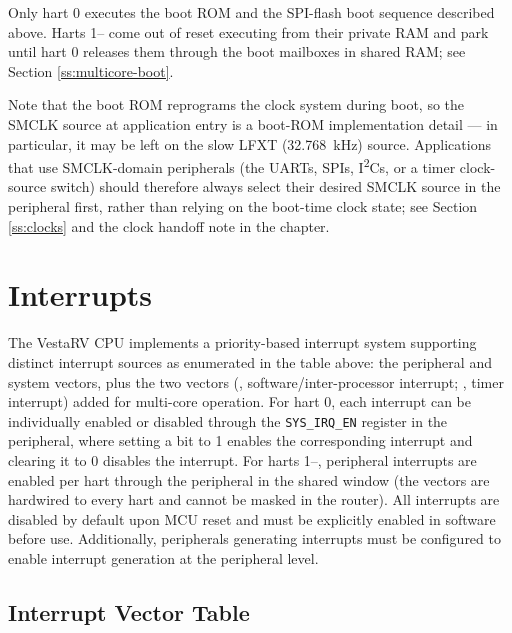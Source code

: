 \documentclass[11pt,pdftex,portrait,letterpaper]{article}
\begin{document}
Only hart 0 executes the boot ROM and the SPI-flash boot sequence described above. Harts 1--\MaxHartIndex{} come out of reset executing from their private RAM and park until hart 0 releases them through the boot mailboxes in shared RAM; see Section \ref{ss:multicore-boot}.

Note that the boot ROM reprograms the clock system during boot, so the SMCLK source at application entry is a boot-ROM implementation detail --- in particular, it may be left on the slow LFXT (32.768~\si{\kilo\hertz}) source. Applications that use SMCLK-domain peripherals (the UARTs, SPIs, I\textsuperscript{2}Cs, or a timer clock-source switch) should therefore always select their desired SMCLK source in the  peripheral first, rather than relying on the boot-time clock state; see Section \ref{ss:clocks} and the clock handoff note in the  chapter.

\newpage



\section{Interrupts} \label{s:interrupts}



The VestaRV CPU implements a priority-based interrupt system supporting \VectorsCount{} distinct interrupt sources as enumerated in the table above: the \PeriphVectorsCount{} peripheral and system vectors, plus the two  vectors (\ClintMsipVector, software/inter-processor interrupt; \ClintMtipVector, timer interrupt) added for multi-core operation. For hart 0, each interrupt can be individually enabled or disabled through the \texttt{SYS\_IRQ\_EN} register in the  peripheral, where setting a bit to 1 enables the corresponding interrupt and clearing it to 0 disables the interrupt. For harts 1--\MaxHartIndex, peripheral interrupts are enabled per hart through the  peripheral in the shared window (the  vectors are hardwired to every hart and cannot be masked in the router). All interrupts are disabled by default upon MCU reset and must be explicitly enabled in software before use. Additionally, peripherals generating interrupts must be configured to enable interrupt generation at the peripheral level.

\subsection{Interrupt Vector Table}
\end{document}
